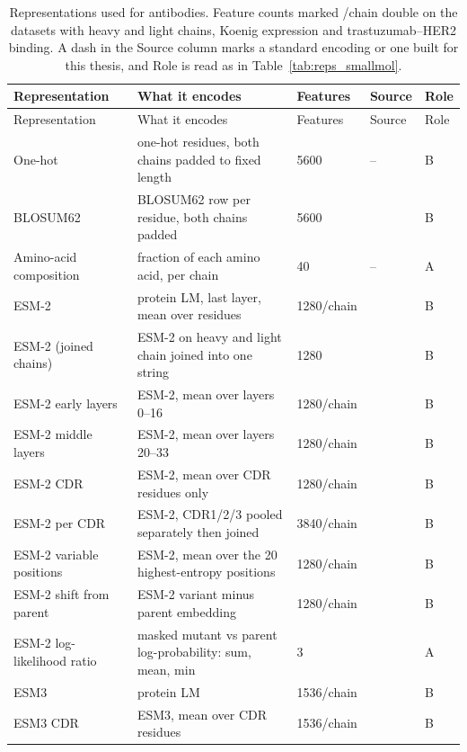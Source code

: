 {\let\small\footnotesize
\begin{longtable}{P{2.8cm}P{4.6cm}P{2.0cm}P{1.5cm}P{1.4cm}}
\caption[Representations used for antibodies.]{Representations used for antibodies. Feature counts marked /chain double on the datasets with heavy and light chains, Koenig expression and trastuzumab--HER2 binding. A dash in the Source column marks a standard encoding or one built for this thesis, and Role is read as in Table~\ref{tab:reps_smallmol}.}\label{tab:reps_antibodies}\\
\toprule
Representation & What it encodes & Features & Source & Role \\
\midrule
\endfirsthead
\toprule
Representation & What it encodes & Features & Source & Role \\
\midrule
\endhead
\bottomrule
\endfoot
One-hot & one-hot residues, both chains padded to fixed length & 5600 & -- & B \\
BLOSUM62 & BLOSUM62 row per residue, both chains padded & 5600 & \citep{Henikoff1992} & B \\
Amino-acid composition & fraction of each amino acid, per chain & 40 & -- & A \\
ESM-2 & protein LM, last layer, mean over residues & 1280/chain & \citep{Lin2023} & B \\
ESM-2 (joined chains) & ESM-2 on heavy and light chain joined into one string & 1280 & \citep{Lin2023} & B \\
ESM-2 early layers & ESM-2, mean over layers 0--16 & 1280/chain & \citep{Lin2023} & B \\
ESM-2 middle layers & ESM-2, mean over layers 20--33 & 1280/chain & \citep{Lin2023} & B \\
ESM-2 CDR & ESM-2, mean over CDR residues only & 1280/chain & \citep{Lin2023} & B \\
ESM-2 per CDR & ESM-2, CDR1/2/3 pooled separately then joined & 3840/chain & \citep{Lin2023} & B \\
ESM-2 variable positions & ESM-2, mean over the 20 highest-entropy positions & 1280/chain & \citep{Lin2023} & B \\
ESM-2 shift from parent & ESM-2 variant minus parent embedding & 1280/chain & \citep{Lin2023} & B \\
ESM-2 log-likelihood ratio & masked mutant vs parent log-probability: sum, mean, min & 3 & \citep{Meier2021} & A \\
ESM3 & protein LM & 1536/chain & \citep{Hayes2025} & B \\
ESM3 CDR & ESM3, mean over CDR residues & 1536/chain & \citep{Hayes2025} & B \\

\end{longtable}}

